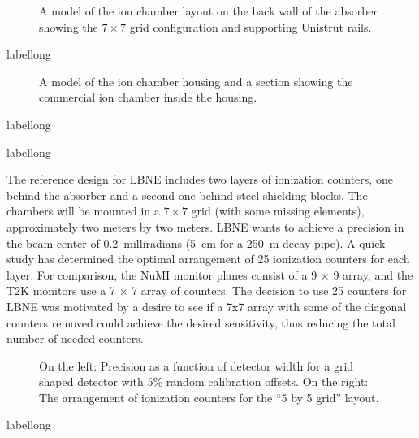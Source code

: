 \begin{figure}[htbp]
\begin{center}
\caption[Model of ion chamber layout]
{A model of the ion chamber layout on the back wall of the absorber
showing the $7\times 7$ grid configuration and supporting Unistrut rails.}
\label{fig:IonChamberLayout}
\end{center}
\end{figure}
\begin{cdrfigure}[short]{label}{long}
\end{cdrfigure}

\begin{figure}[htbp]
\begin{center}
\centering
\caption[Model of ion chamber housing]
{A model of the ion chamber housing and a section showing the commercial ion chamber inside the housing.}
\label{fig:IonChamberHousing}
\end{center}
\end{figure}
\begin{cdrfigure}[short]{label}{long}
\end{cdrfigure}
\begin{cdrfigure}[short]{label}{long}
\end{cdrfigure}

The reference design for LBNE includes two layers of ionization counters, one 
behind the absorber and a second one behind steel shielding blocks. The chambers
will be mounted in a $7 \times 7$ grid (with some missing elements), approximately two meters by two meters. 
LBNE wants to achieve a precision in the beam center of 0.2~milliradians
(5~cm for a 250~m decay pipe). A quick study has 
determined the optimal arrangement of 25 ionization counters for each layer. 
For comparison, the NuMI monitor planes consist of a 
9 $\times$ 9 array, and the T2K monitors use a 7 $\times$ 7 array of counters. 
The decision to use 25 counters for LBNE was motivated by a desire to see if a 7x7 array with some of the diagonal counters removed could achieve the desired sensitivity, thus reducing the total number of needed counters.

\begin{figure}[htb]
\centering
\caption[Ion chamber performance for grid layout]
{On the left: Precision as a function of detector width for a grid 
shaped detector with 5\% random calibration offsets. On the right: The 
arrangement of ionization counters for the ``5 by 5 grid'' layout.}
\label{fig:ion_grid}
\end{figure}
\begin{cdrfigure}[short]{label}{long}
\end{cdrfigure}


